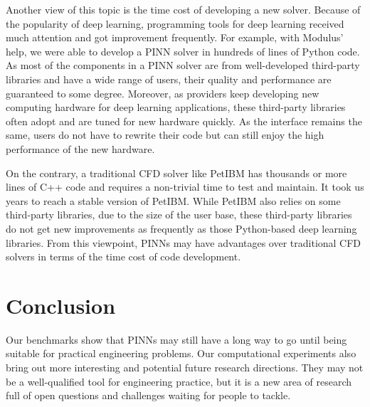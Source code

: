 Another view of this topic is the time cost of developing a new solver. 
Because of the popularity of deep learning, programming tools for deep learning received much attention and got improvement frequently.
For example, with Modulus' help, we were able to develop a PINN solver in hundreds of lines of Python code.
As most of the components in a PINN solver are from well-developed third-party libraries and have a wide range of users, their quality and performance are guaranteed to some degree.
Moreover, as providers keep developing new computing hardware for deep learning applications, these third-party libraries often adopt and are tuned for new hardware quickly.
As the interface remains the same, users do not have to rewrite their code but can still enjoy the high performance of the new hardware.

On the contrary, a traditional CFD solver like PetIBM has thousands or more lines of C++ code and requires a non-trivial time to test and maintain.
It took us years to reach a stable version of PetIBM.
While PetIBM also relies on some third-party libraries, due to the size of the user base, these third-party libraries do not get new improvements as frequently as those Python-based deep learning libraries.
From this viewpoint, PINNs may have advantages over traditional CFD solvers in terms of the time cost of code development.

\section{Conclusion}

Our benchmarks show that PINNs may still have a long way to go until being suitable for practical engineering problems.
Our computational experiments also bring out more interesting and potential future research directions.
They may not be a well-qualified tool for engineering practice, but it is a new area of research full of open questions and challenges waiting for people to tackle.


